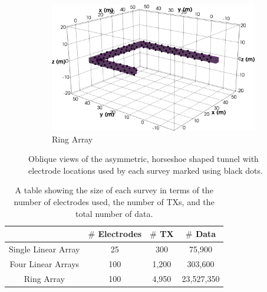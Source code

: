 \documentclass[preprint,authoryear,12pt]{elsarticle}
\begin{document}
\begin{figure}[htp]{}
\begin{center}
      \begin{subfigure}{0.48\linewidth}
         \includegraphics[trim=0cm 0cm 0cm 0cm, clip=true,width=\linewidth]{./figures/Fig14c.png}
         \caption{Ring Array}
         \label{fig:Horseshoe_Ring_5mSep_Oblique}
      \end{subfigure}
   \end{center}
\vspace{-0.4cm}
\caption{Oblique views of the asymmetric, horseshoe shaped tunnel with electrode locations used by each survey marked using black dots.}
\label{fig:Horseshoe_SurveyGeometry}
\end{figure}


\begin{table} [htp]
   \footnotesize
    \begin{center}
        \begin{tabular}{| c | c | c | c |}
            \hline
             & \textbf{\mbox{\boldmath$\#$} Electrodes} & \textbf{\mbox{\boldmath$\#$} TX} & \textbf{\mbox{\boldmath$\#$} Data}\\
            \hline
            Single Linear Array & 25 & 300 & 75,900 \\
            \hline
            Four Linear Arrays & 100 & 1,200 & 303,600 \\
            \hline
            Ring Array & 100 & 4,950 & 23,527,350 \\
            \hline
        \end{tabular}
    \end{center}
\caption{A table showing the size of each survey in terms of the number of electrodes used, the number of TXs, and the total number of data.}
\label{table:SurveyDesign_Horseshoe_FullSurveyStats}
\end{table}
\end{document}
